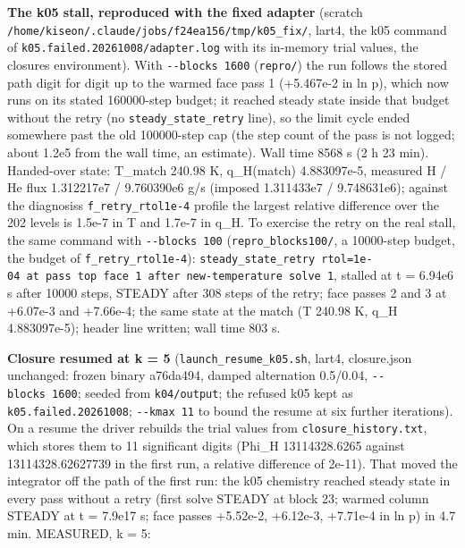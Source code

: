 \documentclass[english,a4paper]{my_memo}
\begin{document}
\textbf{The k05 stall, reproduced with the fixed adapter} (scratch
\texttt{/home/kiseon/.claude/jobs/f24ea156/tmp/k05\_fix/}, lart4, the k05 command of
\texttt{k05.failed.20261008/adapter.log} with its in-memory trial values, the closure\textquotesingle s
environment). With \texttt{-\/-blocks\ 1600} (\texttt{repro/}) the run follows the stored path digit
for digit up to the warmed face pass 1 (+5.467e-2 in ln p), which now runs on its
stated 160000-step budget; it reached steady state inside that budget without the
retry (no \texttt{steady\_state\_retry} line), so the limit cycle ended somewhere past the old
100000-step cap (the step count of the pass is not logged; about 1.2e5 from the wall
time, an estimate). Wall time 8568 s (2 h 23 min). Handed-over state: T\_match
240.98 K, q\_H(match) 4.883097e-5, measured H / He flux 1.312217e7 / 9.760390e6 g/s
(imposed 1.311433e7 / 9.748631e6); against the diagnosis\textquotesingle s \texttt{f\_retry\_rtol1e-4}
profile the largest relative difference over the 202 levels is 1.5e-7 in T and
1.7e-7 in q\_H. To exercise the retry on the real stall, the same command with
\texttt{-\/-blocks\ 100} (\texttt{repro\_blocks100/}, a 10000-step budget, the budget of
\texttt{f\_retry\_rtol1e-4}): \texttt{steady\_state\_retry\ rtol=1e-04\ at\ pass\ top\ face\ 1\ after\ new-temperature\ solve\ 1}, stalled at t = 6.94e6 s after 10000 steps, STEADY after
308 steps of the retry; face passes 2 and 3 at +6.07e-3 and +7.66e-4; the same state
at the match (T 240.98 K, q\_H 4.883097e-5); header line written; wall time 803 s.

\textbf{Closure resumed at k = 5} (\texttt{launch\_resume\_k05.sh}, lart4, closure.json unchanged:
frozen binary a76da494, damped alternation 0.5/0.04, \texttt{-\/-blocks\ 1600}; seeded from
\texttt{k04/output}; the refused k05 kept as \texttt{k05.failed.20261008}; \texttt{-\/-kmax\ 11} to bound the
resume at six further iterations). On a resume the driver rebuilds the trial values
from \texttt{closure\_history.txt}, which stores them to 11 significant digits
(Phi\_H 13114328.6265 against 13114328.62627739 in the first run, a relative
difference of 2e-11). That moved the integrator off the path of the first run: the
k05 chemistry reached steady state in every pass without a retry (first solve STEADY
at block 23; warmed column STEADY at t = 7.9e17 s; face passes +5.52e-2, +6.12e-3,
+7.71e-4 in ln p) in 4.7 min. MEASURED, k = 5:
\end{document}
